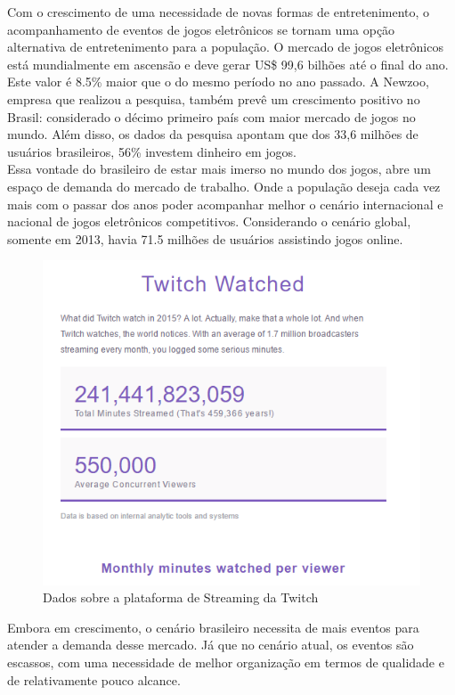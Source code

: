 \documentclass[a4paper, 12pt]{paper}
\begin{document}
Com o crescimento de uma necessidade de novas formas de entretenimento, o acompanhamento de eventos de jogos eletrônicos se tornam uma opção alternativa de entretenimento para a população. O mercado de jogos eletrônicos está mundialmente em ascensão e deve gerar US\$ 99,6 bilhões até o final do ano. Este valor é 8.5\% maior que o do mesmo período no ano passado. A Newzoo, empresa que realizou a pesquisa, também prevê um crescimento positivo no Brasil: considerado o décimo primeiro país com maior mercado de jogos no mundo. Além disso, os dados da pesquisa apontam que dos 33,6 milhões de usuários brasileiros, 56\% investem dinheiro em jogos.\\
Essa vontade do brasileiro de estar mais imerso no mundo dos jogos, abre um espaço de demanda do mercado de trabalho. Onde a população deseja cada vez mais com o passar dos anos poder acompanhar melhor o cenário internacional e nacional de jogos eletrônicos competitivos. Considerando o cenário global, somente em 2013, havia 71.5 milhões de usuários assistindo jogos online.
\begin{figure}[!ht]
	\centering
	\includegraphics[scale=1]{img/img02.png}
	\caption{Dados sobre a plataforma de Streaming da Twitch}	
\end{figure}
Embora em crescimento, o cenário brasileiro necessita de mais eventos para atender a demanda desse mercado. Já que no cenário atual, os eventos são escassos, com uma necessidade de melhor organização em termos de qualidade e de relativamente pouco alcance.
\end{document}
